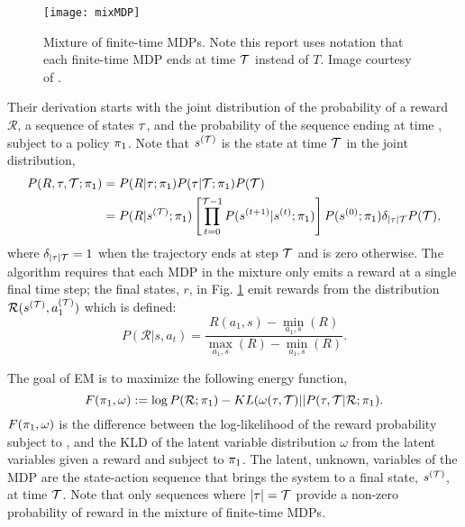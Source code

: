     \begin{figure}
        \centering
        \texttt{[image: mixMDP]}
        \caption{Mixture of finite-time MDPs. Note this report uses notation that each finite-time MDP ends at time
                 $\mathcal{T}$ instead of $T$. Image courtesy of \cite{toussaint2010expectation}.}
        \label{fig:mixMDP}
    \end{figure}

    Their derivation starts with the joint distribution of the probability of a reward $\mathcal{R}$, a sequence of
    states $\tau$, and the probability of the sequence ending at time \Tau, subject to a policy $\pi_{1}$. Note that
    $s^{(\mathcal{T})}$ is the state at time $\mathcal{T}$ in the joint distribution,
    \begin{equation} \label{eq:em_joint_dist}
        \begin{split}
            P(R,\tau,\mathcal{T};\pi_{1})
                & = P(R|\tau;\pi_{1})P(\tau|\mathcal{T};\pi_{1})P(\mathcal{T}) \\
                & = P(R|s^{(\mathcal{T})};\pi_{1})\left[\prod_{t=0}^{\mathcal{T}-1}P(s^{(t+1)}|s^{(t)};\pi_{1})\right]
                        P(s^{(0)};\pi_{1})\delta_{|\tau|\mathcal{T}}P(\mathcal{T}),
        \end{split}
    \end{equation}
    where $\delta_{|\tau|\mathcal{T}}=1$ when the trajectory ends at step $\mathcal{T}$ and is zero otherwise. The algorithm requires
    that each MDP in the mixture only emits a reward at a single final time step; the final states, $r$, in Fig.
    \ref{fig:mixMDP} emit rewards from the distribution $\mathcal{R}(s^{(\mathcal{T})},a_1^{(\mathcal{T})})$ which is defined:
    \[
    P(\mathcal{R}|s,a_t) = \frac{R(a_1,s) - \min_{a_1,s}(R)}{\max_{a_1,s}(R) - \min_{a_1,s}(R)}.
    \]

    \par
    The goal of EM is to maximize the following energy function,
    \[
    F(\pi_{1},\omega) := \log P(\mathcal{R};\pi_{1}) - KL(\omega(\tau,\mathcal{T})||P(\tau,\mathcal{T}|\mathcal{R};\pi_{1}).
    \]
    $F(\pi_{1},\omega)$ is the difference between the log-likelihood of the reward probability subject to ,
    and the \ac{KLD} of the latent variable distribution $\omega$ from the latent variables given a reward and subject
    to $\pi_{1}$. The latent, unknown, variables of the \ac{MDP} are the state-action sequence that brings the system
    to a final state, $s^{(\mathcal{T})}$, at time $\mathcal{T}$. Note that only sequences where $|\tau|= \mathcal{T}$ provide a non-zero
    probability of reward in the mixture of finite-time \acp{MDP}.

